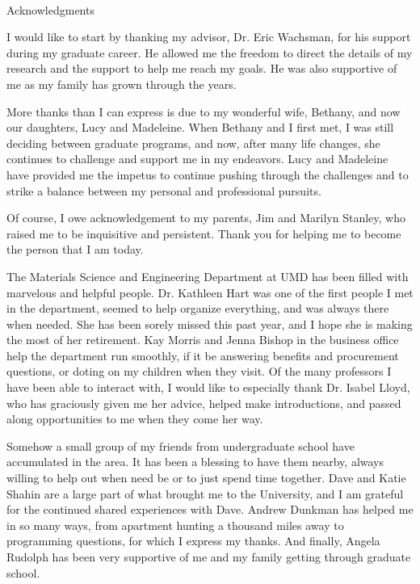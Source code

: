 

\renewcommand{\baselinestretch}{2}
\small\normalsize
\hbox{\ }

\vspace{-.65in}

\begin{center}
\large{Acknowledgments}
\end{center}

\vspace{1ex}

I would like to start by thanking my advisor, Dr. Eric Wachsman, for his support during my graduate career.
He allowed me the freedom to direct the details of my research and the support to help me reach my goals.
He was also supportive of me as my family has grown through the years.

More thanks than I can express is due to my wonderful wife, Bethany, and now our daughters, Lucy and Madeleine.
When Bethany and I first met, I was still deciding between graduate programs, and now, after many life changes, she continues to challenge and support me in my endeavors.
Lucy and Madeleine have provided me the impetus to continue pushing through the challenges and to strike a balance between my personal and professional pursuits.

Of course, I owe acknowledgement to my parents, Jim and Marilyn Stanley, who raised me to be inquisitive and persistent.
Thank you for helping me to become the person that I am today.

The Materials Science and Engineering Department at UMD has been filled with marvelous and helpful people.
Dr. Kathleen Hart was one of the first people I met in the department, seemed to help organize everything, and was always there when needed.
She has been sorely missed this past year, and I hope she is making the most of her retirement.
Kay Morris and Jenna Bishop in the business office help the department run smoothly, if it be answering benefits and procurement questions, or doting on my children when they visit.
Of the many professors I have been able to interact with, I would like to especially thank Dr. Isabel Lloyd, who has graciously given me her advice, helped make introductions, and passed along opportunities to me when they come her way.

Somehow a small group of my friends from undergraduate school have accumulated in the area.
It has been a blessing to have them nearby, always willing to help out when need be or to just spend time together.
Dave and Katie Shahin are a large part of what brought me to the University, and I am grateful for the continued shared experiences with Dave.
Andrew Dunkman has helped me in so many ways, from apartment hunting a thousand miles away to programming questions, for which I express my thanks.
And finally, Angela Rudolph has been very supportive of me and my family getting through graduate school.


